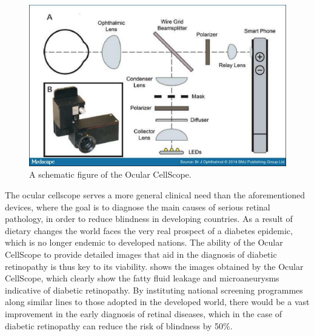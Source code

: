 \begin{figure}[H]
\centering
\includegraphics[width=12cm]{figures/ocular}
\caption{A schematic figure of the Ocular CellScope.\cite{medscape} }
\label{fig:ocular}
\end{figure}

The ocular cellscope serves a more general clinical need than the aforementioned
devices, where the goal is to diagnose the main causes of serious retinal pathology,
in order to reduce blindness in developing countries. As a result of dietary changes
the world faces the very real prospect of a diabetes epidemic, which is no longer
endemic to developed nations. \cite{burgess2013diabetic} The ability of the Ocular
CellScope to provide detailed images that aid in the diagnosis of diabetic retinopathy
is thus key to its viability.  shows the images obtained by the Ocular
CellScope, which clearly show the fatty fluid leakage and microaneurysms indicative of
diabetic retinopathy. By instituting national screening programmes along similar lines
to those adopted in the developed world, there would be a vast improvement in the early
diagnosis of retinal diseases, which in the case of diabetic retinopathy can reduce the
risk of blindness by 50\%. \cite{abramoff2010automated}

